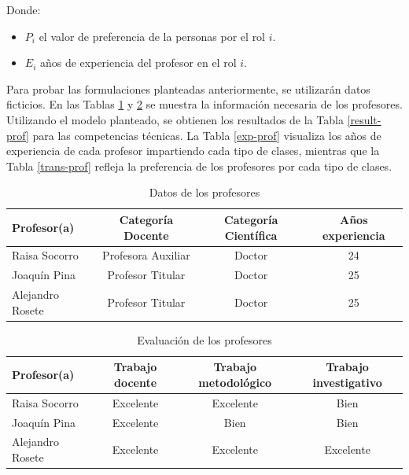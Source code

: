\vspace{0.3cm}
Donde:
\begin{itemize}
	\item $P_i$ el valor de preferencia de la personas por el rol $i$.
	\item $E_i$ años de experiencia del profesor en el rol $i$.
\end{itemize}

\vspace{0.5cm}

Para probar las formulaciones planteadas anteriormente, se utilizarán datos ficticios. En las Tablas \ref{datos-prof1} y  \ref{datos-prof2} se muestra la información necesaria de los profesores. Utilizando el modelo planteado, se obtienen los resultados de la Tabla \ref{result-prof} para las competencias técnicas. La Tabla \ref{exp-prof}  visualiza los años de experiencia de cada profesor impartiendo cada tipo de clases, mientras que la Tabla \ref{trans-prof} refleja la preferencia de los profesores por cada tipo de clases.

\begin{table}[H]
	\centering
	\caption{Datos de los profesores}\label{datos-prof1}
		\begin{tabular}{l c c c }
			\toprule[1.7pt]
		Profesor(a) & Categoría Docente  & Categoría Científica & Años experiencia \\ \midrule
			Raisa Socorro                             & Profesora Auxiliar & Doctor               & 24               \\
		\rowcolor{gray!30}	Joaquín Pina                              & Profesor Titular   & Doctor               & 25               \\
			Alejandro Rosete                          & Profesor Titular   & Doctor               & 25               \\
			\bottomrule[1pt]            
		\end{tabular}
\end{table}

\begin{table}[H]
	\caption{Evaluación de los profesores}\label{datos-prof2}
	\centering
	\begin{tabular}{l c c c}
		\toprule[1.7pt]
		Profesor(a) & Trabajo docente & Trabajo metodológico & Trabajo investigativo \\ \midrule
		Raisa Socorro                             & Excelente       & Excelente            & Bien                  \\
		\rowcolor{gray!30} Joaquín Pina                              & Excelente       & Bien                 & Bien                  \\
		Alejandro Rosete                          & Excelente       & Excelente            & Excelente             \\
	\bottomrule[1pt]        
	\end{tabular}
\end{table}




